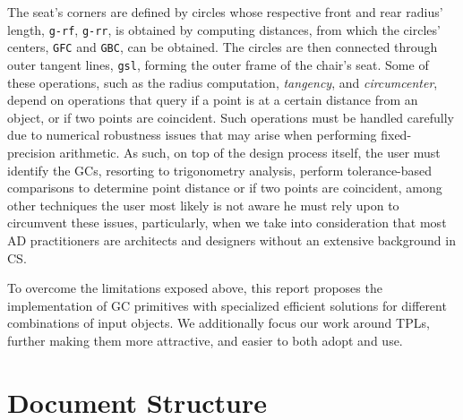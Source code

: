 The seat's corners are defined by circles whose respective front and rear
radius' length, \texttt{g-rf}, \texttt{g-rr}, is obtained by computing
distances, from which the circles' centers, \texttt{GFC} and \texttt{GBC}, can
be obtained.  The circles are then connected through outer tangent lines,
\texttt{gsl}, forming the outer frame of the chair's seat.  Some of these
operations, such as the radius computation, \textit{tangency}, and
\textit{circumcenter}, depend on operations that query if a point is at a
certain distance from an object, or if two points are coincident.  Such
operations must be handled carefully due to numerical robustness issues that may
arise when performing fixed-precision arithmetic.  As such, on top of the design
process itself, the user must identify the \acp{GC}, resorting to trigonometry
analysis, perform tolerance-based comparisons to determine point distance or if
two points are coincident, among other techniques the user most likely is not
aware he must rely upon to circumvent these issues, particularly, when we take
into consideration that most \ac{AD} practitioners are architects and designers
without an extensive background in \ac{CS}.

To overcome the limitations exposed above, this report proposes the
implementation of \ac{GC} primitives with specialized efficient solutions for
different combinations of input objects.  We additionally focus our work around
\acp{TPL}, further making them more attractive, and easier to both adopt and
use.

\section{Document Structure}%
\label{sec:intro.structure}

